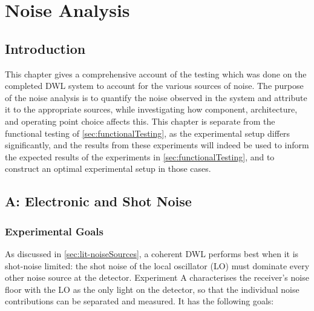 \chapter{Noise Analysis}
\label{sec:noiseAnalysis}

 \section{Introduction}
 This chapter gives a comprehensive account of the testing which was done on the completed DWL system to account for the various sources of noise. The purpose of the noise analysis is to quantify the noise observed in the system and attribute it to the appropriate sources, while investigating how component, architecture, and operating point choice affects this. This chapter is separate from the functional testing of \autoref{sec:functionalTesting}, as the experimental setup differs significantly, and the results from these experiments will indeed be used to inform the expected results of the experiments in \autoref{sec:functionalTesting}, and to construct an optimal experimental setup in those cases.

 \section{A: Electronic and Shot Noise}
 
 \subsection{Experimental Goals}
 As discussed in \autoref{sec:lit-noiseSources}, a coherent DWL performs best when it is
 shot-noise limited: the shot noise of the local oscillator (LO) must dominate every other
 noise source at the detector. Experiment A characterises the receiver's noise floor with
 the LO as the only light on the detector, so that the individual noise contributions can be
 separated and measured. It has the following goals:
 
